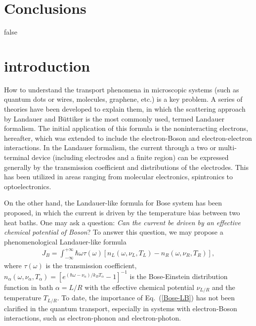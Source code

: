 \documentclass[aps
,floatfix,footinbib,
preprint
]{revtex4-1}
\begin{document}
\section{Conclusions}



\if false
\clearpage
\appendix
\section{introduction}
How to understand the transport phenomena in microscopic systems (such as quantum dots or wires, molecules, graphene, etc.) is a key problem. A series of
theories have been developed to explain them, in which the scattering approach by Landauer\cite{landauer1957spatial} and B\"{u}ttiker\cite{buttiker1986four} is the most commonly used, termed Landauer formalism. The initial application of this formula is the noninteracting electrons, hereafter, which was extended to include the electron-Boson and electron-electron interactions\cite{meir1992landauer,jauho1994time,lu2007coupled}.
In the Landauer formalism, the current through a two or multi- terminal device (including electrodes and a finite region) can be expressed generally by the transmission coefficient and distributions of the electrodes. This has been utilized in areas ranging from molecular electronics, spintronics to optoelectronics\cite{galperin2007molecular,haug2008quantum,galperin2012molecular}.

On the other hand, the Landauer-like formula for Bose system has been proposed, in which the current is driven by the temperature bias between two heat baths\cite{wang2006nonequilibrium,wang2007nonequilibrium,wang2008quantum,ojanen2008mesoscopic,ruokola2009thermal,li2012colloquium,taylor2015quantum,wang2016landauer}. One may ask a question: \emph{Can the current be driven by an effective chemical potential of Boson}? To answer this question, we may propose a phenomenological Landauer-like formula 
\begin{equation}
\begin{split}
J_{B}=\int_{-\infty}^{+\infty}\hbar\omega \tau(\omega)[n_{L}(\omega,\nu_{L},T_{L})-n_{R}(\omega,\nu_{R},T_{R})],
\end{split}
\label{Bose-LB}
\end{equation}
where $\tau(\omega)$ is the transmission coefficient, $n_{\alpha}(\omega,\nu_{\alpha},T_{\alpha})=[e^{(\hbar\omega-\nu_{\alpha})/k_{B}T_{\alpha}}-1]^{-1}$ is the Bose-Einstein
distribution function in bath $\alpha=L/R$ with the effective chemical potential $\nu_{L/R}$ and the temperature $T_{L/R}$. 
To date, the importance of Eq.~(\ref{Bose-LB}) has not been clarified in the quantum transport, especially in systems with electron-Boson interactions, such as electron-phonon and electron-photon.
\end{document}

